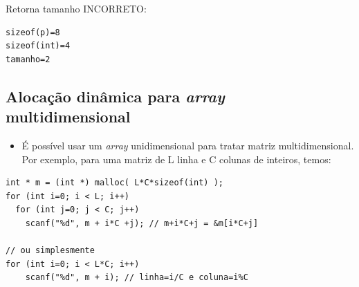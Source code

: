 \documentclass[12pt,a4paper]{article}
\providecommand{\tightlist}{%
      \setlength{\itemsep}{0pt}\setlength{\parskip}{0pt}}
\begin{document}
Retorna tamanho INCORRETO:

\begin{verbatim}
sizeof(p)=8
sizeof(int)=4
tamanho=2
\end{verbatim}

    \hypertarget{alocauxe7uxe3o-dinuxe2mica-para-array-multidimensional}{%
\subsection{\texorpdfstring{Alocação dinâmica para \emph{array}
multidimensional}{Alocação dinâmica para array multidimensional}}\label{alocauxe7uxe3o-dinuxe2mica-para-array-multidimensional}}

    \begin{itemize}
\tightlist
\item
  É possível usar um \emph{array} unidimensional para tratar matriz
  multidimensional. Por exemplo, para uma matriz de L linha e C colunas
  de inteiros, temos:
\end{itemize}

\begin{verbatim}
int * m = (int *) malloc( L*C*sizeof(int) );
for (int i=0; i < L; i++)
  for (int j=0; j < C; j++)
    scanf("%d", m + i*C +j); // m+i*C+j = &m[i*C+j]

// ou simplesmente
for (int i=0; i < L*C; i++)
    scanf("%d", m + i); // linha=i/C e coluna=i%C
\end{verbatim}
\end{document}
